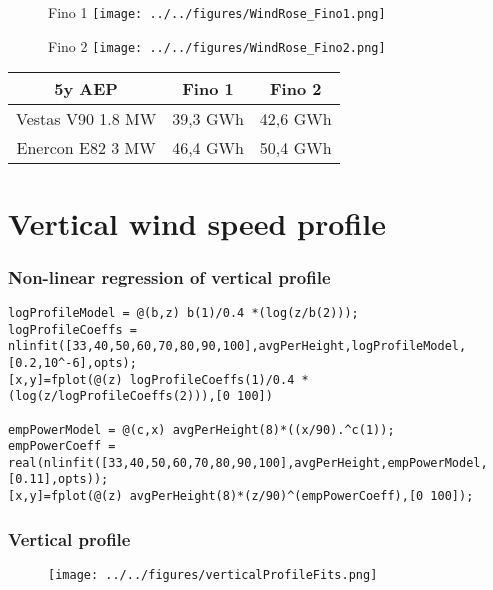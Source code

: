 \documentclass[12pt,t]{beamer}
\begin{document}
\begin{frame}
\begin{figure}[htbp]
	\begin{center}
		\begin{minipage}[t]{0.45\linewidth}
			\centering
			Fino 1
			\texttt{[image: ../../figures/WindRose\_Fino1.png]}
			
			
		\end{minipage}
		\begin{minipage}[t]{0.45\linewidth}
			\centering
			Fino 2
			\texttt{[image: ../../figures/WindRose\_Fino2.png]}

		\end{minipage}
	\end{center}
\end{figure}
\begin{tabular}{c| c| c}
			5y AEP 	& Fino 1 & Fino 2 \\ 
				\hline
			Vestas V90 1.8 MW & 39,3 GWh & 42,6 GWh \\
			\hline
			Enercon E82 3 MW& 46,4 GWh & 50,4 GWh \\
			\end{tabular}
\end{frame}


\section{Vertical wind speed profile}

\begin{frame}[fragile]
\frametitle{Non-linear regression of vertical profile}
\vspace{40 pt}
\begin{lstlisting}
logProfileModel = @(b,z) b(1)/0.4 *(log(z/b(2)));
logProfileCoeffs = nlinfit([33,40,50,60,70,80,90,100],avgPerHeight,logProfileModel,[0.2,10^-6],opts);
[x,y]=fplot(@(z) logProfileCoeffs(1)/0.4 *(log(z/logProfileCoeffs(2))),[0 100])

empPowerModel = @(c,x) avgPerHeight(8)*((x/90).^c(1));
empPowerCoeff = real(nlinfit([33,40,50,60,70,80,90,100],avgPerHeight,empPowerModel,[0.11],opts));
[x,y]=fplot(@(z) avgPerHeight(8)*(z/90)^(empPowerCoeff),[0 100]);
\end{lstlisting}
\end{frame}

\begin{frame}[fragile]
\frametitle{Vertical profile}
\begin{figure}[H]
\centering
\texttt{[image: ../../figures/verticalProfileFits.png]}
\label{fig:weatherpattern}
\end{figure}
\end{frame}
\end{document}
